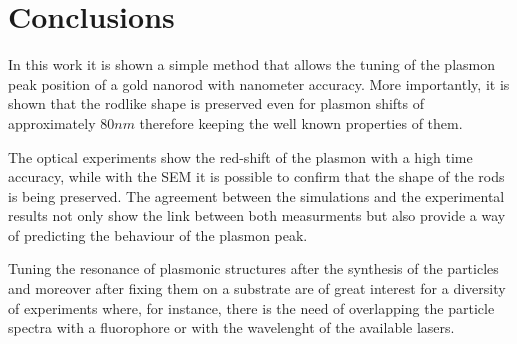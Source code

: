 \documentclass[twocolumn]{article}
\begin{document}
\section{Conclusions}
In this work it is shown a simple method that allows the tuning of the plasmon
peak position of a gold nanorod with nanometer accuracy. More importantly, it is
shown that the rodlike shape is preserved even for plasmon shifts of
approximately $80nm$ therefore keeping the well known properties of them. 

The optical experiments show the red-shift of the plasmon with a high time
accuracy, while with the SEM it is possible to confirm that the shape of the
rods is being preserved. The agreement between the simulations and the
experimental results not only show the link between both measurments but also
provide a way of predicting the behaviour of the plasmon peak. 

Tuning the resonance of plasmonic structures after the synthesis of the
particles and moreover after fixing them on a substrate are of great interest
for a diversity of experiments where, for instance, there is the need of
overlapping the particle spectra with a fluorophore or with the wavelenght of
the available lasers.
\end{document}
